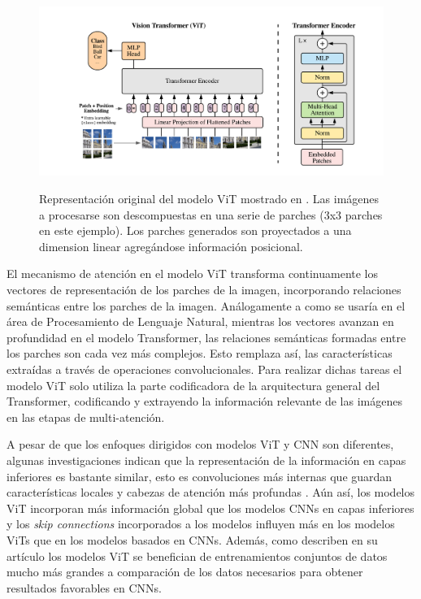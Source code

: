 {\begin{figure}[htp]
    \centering
    {\includegraphics[width=1.0\textwidth]{Chapters/4. ViT-Lung/images/ViT.png}}
\caption{Representación original del modelo ViT mostrado en \cite{DBLP:journals/corr/abs-2010-11929}.
Las imágenes a procesarse son descompuestas en una serie de parches (3x3 parches en este ejemplo). Los
parches generados son proyectados a una dimension linear agregándose información posicional.}
\label{fig_ViT}
\end{figure}

El mecanismo de atención en el modelo ViT transforma continuamente los vectores de representación de
los parches de la imagen, incorporando relaciones semánticas entre los parches de la imagen.
Análogamente a como se usaría en el área de Procesamiento de Lenguaje Natural, mientras los vectores
avanzan en profundidad en el modelo Transformer, las relaciones semánticas formadas entre los parches
son cada vez más complejos. Esto remplaza así, las características extraídas a través de operaciones
convolucionales. Para realizar dichas tareas el modelo ViT solo utiliza la parte codificadora de la
arquitectura general del Transformer, codificando y extrayendo la información relevante de las imágenes
en las etapas de multi-atención.

A pesar de que los enfoques dirigidos con modelos ViT y CNN son diferentes, algunas investigaciones
indican que la representación de la información en capas inferiores es bastante similar, esto es
convoluciones más internas que guardan características locales y cabezas de atención más profundas
\cite{DBLP:journals/corr/abs-2108-08810}. Aún así, los modelos ViT incorporan más información global
que los modelos CNNs en capas inferiores y los \textit{skip connections} incorporados a los modelos
influyen más en los modelos ViTs
que en los modelos basados en CNNs. Además, como describen en su artículo \citeauthor{DBLP:journals/corr/abs-2010-11929}
los modelos ViT se benefician de entrenamientos conjuntos de datos mucho más grandes a comparación
de los datos necesarios para obtener resultados favorables en CNNs.

}
